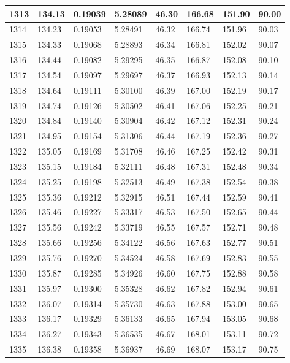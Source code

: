 \documentclass[12pt,a4paper,twoside]{article}
\begin{document}
\begin{center}
\begin{longtable}{l l l l | l l l l}
1313 & 134.13 & 0.19039 & 5.28089 & 46.30 & 166.68 & 151.90 & 90.00 \\ \hline
1314 & 134.23 & 0.19053 & 5.28491 & 46.32 & 166.74 & 151.96 & 90.03 \\ \hline
1315 & 134.33 & 0.19068 & 5.28893 & 46.34 & 166.81 & 152.02 & 90.07 \\ \hline
1316 & 134.44 & 0.19082 & 5.29295 & 46.35 & 166.87 & 152.08 & 90.10 \\ \hline
1317 & 134.54 & 0.19097 & 5.29697 & 46.37 & 166.93 & 152.13 & 90.14 \\ \hline
1318 & 134.64 & 0.19111 & 5.30100 & 46.39 & 167.00 & 152.19 & 90.17 \\ \hline
1319 & 134.74 & 0.19126 & 5.30502 & 46.41 & 167.06 & 152.25 & 90.21 \\ \hline
1320 & 134.84 & 0.19140 & 5.30904 & 46.42 & 167.12 & 152.31 & 90.24 \\ \hline
1321 & 134.95 & 0.19154 & 5.31306 & 46.44 & 167.19 & 152.36 & 90.27 \\ \hline
1322 & 135.05 & 0.19169 & 5.31708 & 46.46 & 167.25 & 152.42 & 90.31 \\ \hline
1323 & 135.15 & 0.19184 & 5.32111 & 46.48 & 167.31 & 152.48 & 90.34 \\ \hline
1324 & 135.25 & 0.19198 & 5.32513 & 46.49 & 167.38 & 152.54 & 90.38 \\ \hline
1325 & 135.36 & 0.19212 & 5.32915 & 46.51 & 167.44 & 152.59 & 90.41 \\ \hline
1326 & 135.46 & 0.19227 & 5.33317 & 46.53 & 167.50 & 152.65 & 90.44 \\ \hline
1327 & 135.56 & 0.19242 & 5.33719 & 46.55 & 167.57 & 152.71 & 90.48 \\ \hline
1328 & 135.66 & 0.19256 & 5.34122 & 46.56 & 167.63 & 152.77 & 90.51 \\ \hline
1329 & 135.76 & 0.19270 & 5.34524 & 46.58 & 167.69 & 152.83 & 90.55 \\ \hline
1330 & 135.87 & 0.19285 & 5.34926 & 46.60 & 167.75 & 152.88 & 90.58 \\ \hline
1331 & 135.97 & 0.19300 & 5.35328 & 46.62 & 167.82 & 152.94 & 90.61 \\ \hline
1332 & 136.07 & 0.19314 & 5.35730 & 46.63 & 167.88 & 153.00 & 90.65 \\ \hline
1333 & 136.17 & 0.19329 & 5.36133 & 46.65 & 167.94 & 153.05 & 90.68 \\ \hline
1334 & 136.27 & 0.19343 & 5.36535 & 46.67 & 168.01 & 153.11 & 90.72 \\ \hline
1335 & 136.38 & 0.19358 & 5.36937 & 46.69 & 168.07 & 153.17 & 90.75 \\ \hline

\end{longtable}
\end{center}
\end{document}
